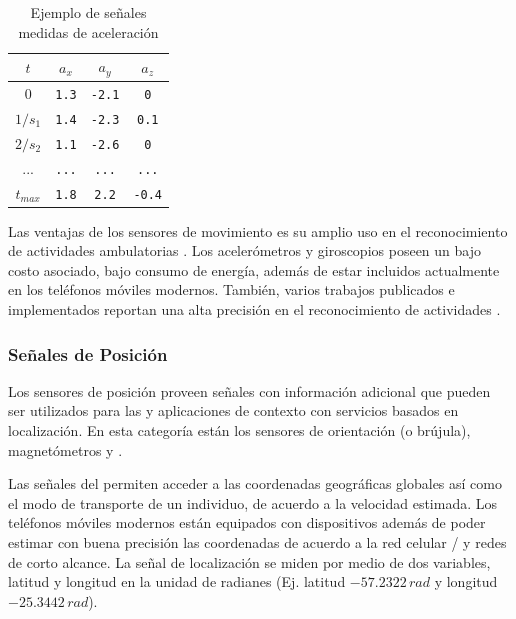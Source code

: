 \begin{table}[!tbph]
\begin{centering}
\begin{tabular}{|c|c|c|c|}
\hline 
$t$ & $a_{x}$ & $a_{y}$ & $a_{z}$\tabularnewline
\hline 
\hline 
$0$ & \texttt{1.3} & \texttt{-2.1} & \texttt{0}\tabularnewline
\hline 
$1/s_{1}$ & \texttt{1.4} & \texttt{-2.3} & \texttt{0.1}\tabularnewline
\hline 
$2/s_{2}$ & \texttt{1.1} & \texttt{-2.6} & \texttt{0}\tabularnewline
\hline 
... & \texttt{...} & \texttt{...} & \texttt{...}\tabularnewline
\hline 
$t_{max}$ & \texttt{1.8} & \texttt{2.2} & \texttt{-0.4}\tabularnewline
\hline 
\end{tabular}
\par\end{centering}
\caption[Ejemplo de señales medidas de aceleración]{\label{tab421:ex-signal}Ejemplo de señales medidas de aceleración}
\end{table}

Las ventajas de los sensores de movimiento es su amplio uso en el
reconocimiento de actividades ambulatorias \cite{Bao2004,Kwapisz2011,ReyesOrtiz2015}.
Los acelerómetros y giroscopios poseen un bajo costo asociado, bajo
consumo de energía, además de estar incluidos actualmente en los teléfonos
móviles modernos. También, varios trabajos publicados e implementados
reportan una alta precisión en el reconocimiento de actividades \cite{Bao2004,LaraLabrador2012}.

\subsubsection{Señales de Posición}

Los sensores de posición proveen señales con información adicional
que pueden ser utilizados para las  y aplicaciones de contexto
con servicios basados en localización. En esta categoría están los
sensores de orientación (o brújula), magnetómetros y \cite{Google2016s}.

Las señales del  permiten acceder a las coordenadas geográficas
globales así como el modo de transporte de un individuo, de acuerdo
a la velocidad estimada. Los teléfonos móviles modernos están equipados
con dispositivos  además de poder estimar con buena precisión
las coordenadas de acuerdo a la red celular /
y redes  de corto alcance. La señal de localización se
miden por medio de dos variables, latitud y longitud en la unidad
de radianes (Ej. latitud $-57.2322\,rad$ y longitud $-25.3442\,rad$).

